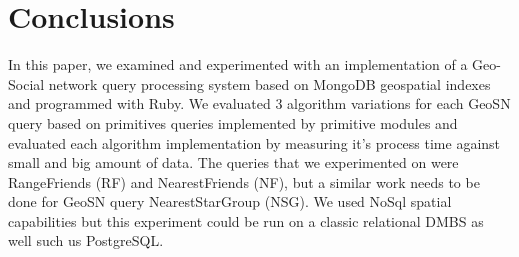 \documentclass[prodmode,acmtods]{acmsmall} %
\begin{document}
\clearpage{}
\section{Conclusions}
In this paper, we examined and experimented with an implementation of a Geo-Social network 
query processing system based on MongoDB geospatial indexes and programmed with Ruby. 
We evaluated 3 algorithm variations for each GeoSN query based on primitives queries implemented by primitive modules and evaluated each algorithm
implementation by measuring it's process time against small and big amount of data. The queries that we experimented on were RangeFriends (RF) and NearestFriends (NF),
but a similar work needs to be done for GeoSN query NearestStarGroup (NSG). We used NoSql spatial capabilities but this experiment could be run on a 
classic relational DMBS as well such us PostgreSQL.



%

\end{document}
